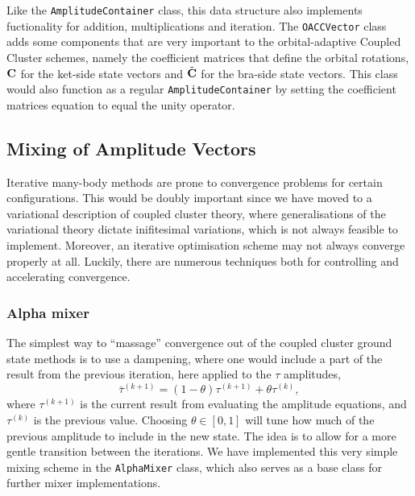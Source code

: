     Like the \lstinline{AmplitudeContainer} class, this data structure also implements 
    fuctionality for addition, multiplications and iteration. The \lstinline{OACCVector}
    class adds some components 
    that are very important to the orbital-adaptive Coupled Cluster schemes, namely 
    the coefficient matrices that define the orbital rotations, $\vb{C}$ for the 
    ket-side state vectors and $\tilde{\vb{C}}$ for the bra-side state vectors. This class 
    would also function as a regular \lstinline{AmplitudeContainer} by setting the 
    coefficient matrices equation to equal the unity operator.
    
\subsection{Mixing of Amplitude Vectors}

    Iterative many-body methods are prone to convergence problems for certain configurations.
    This would be doubly important since we have moved to a variational description 
    of coupled cluster theory,
    where generalisations of the variational theory dictate inifitesimal variations, which 
    is not always feasible to implement.
    Moreover, an iterative optimisation scheme may not always converge properly at all. 
    Luckily, there are numerous techniques both for controlling and accelerating 
    convergence.

    \subsubsection{Alpha mixer}

    \begin{figure}
    
    \end{figure}

    The simplest way to ``massage'' convergence out of the coupled cluster ground state methods
    is to use a dampening, where one would include a part of the result from the previous 
    iteration, here applied to the $\tau$ amplitudes,
    \begin{equation}
        \bar{\tau}^{(k+1)} = (1 - \theta)\tau^{(k+1)} + \theta\tau^{(k)},
    \end{equation}
    where $\tau^{(k+1)}$ is the current result from evaluating the amplitude equations, 
    and $\tau^{(k)}$ is the previous value. Choosing $\theta \in [0,1]$ will tune how
    much of the previous amplitude to include in the new state. The idea is to allow for 
    a more gentle transition between the iterations. We have implemented this 
    very simple mixing scheme in the \lstinline{AlphaMixer} class, which also serves as 
    a base class for further mixer implementations.

